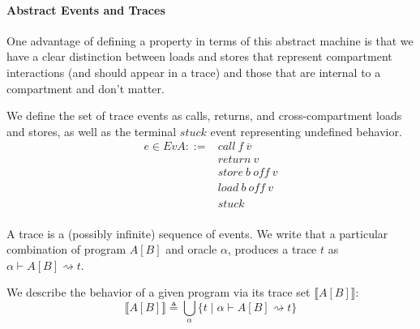 \documentclass{article}
\begin{document}
\paragraph{Abstract Events and Traces}

One advantage of defining a property in terms of this abstract machine is that we have a clear
distinction between loads and stores that represent compartment interactions (and should appear
in a trace) and those that are internal to a compartment and don't matter.

We define the set of trace events as calls, returns, and cross-compartment loads and stores,
as well as the terminal \(\mathit{stuck}\) event representing undefined behavior.
\[\begin{split}
e \in EvA ::= & \mathit{call} ~ f ~ \overline{v} \\
& \mathit{return} ~ v \\
& \mathit{store} ~ b ~ \mathit{off} ~ v \\
& \mathit{load} ~ b ~ \mathit{off} ~ v \\
& \mathit{stuck} \\
\end{split}\]

A trace is a (possibly infinite) sequence of events.
We write that a particular combination of program \(A[B]\) and oracle \(\alpha\),
produces a trace \(t\) as \(\alpha \vdash A[B] \rightsquigarrow t\).

We describe the behavior of a given program via its trace set \(\llbracket A[B] \rrbracket\): 
\[\llbracket A[B] \rrbracket \triangleq \bigcup_{\alpha}
\{ t \mid \alpha \vdash A[B] \rightsquigarrow t \}\]
\end{document}

